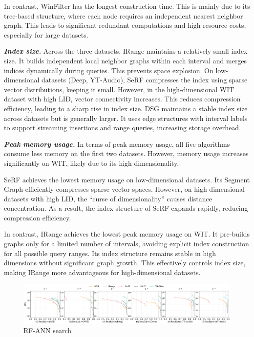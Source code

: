 \documentclass[sigconf, nonacm]{acmart}
\begin{document}
\begin{sloppypar}
In contrast, WinFilter has the longest construction time. This is mainly due to its tree-based structure, where each node requires an independent nearest neighbor graph. This leads to significant redundant computations and high resource costs, especially for large datasets.






\textit{\textbf{Index size.}} Across the three datasets, IRange maintains a relatively small index size. It builds independent local neighbor graphs within each interval and merges indices dynamically during queries. This prevents space explosion. On low-dimensional datasets (Deep, YT-Audio), SeRF compresses the index using sparse vector distributions, keeping it small. However, in the high-dimensional WIT dataset with high LID, vector connectivity increases. This reduces compression efficiency, leading to a sharp rise in index size. DSG maintains a stable index size across datasets but is generally larger. It uses edge structures with interval labels to support streaming insertions and range queries, increasing storage overhead.


\textit{\textbf{Peak memory usage.}}
In terms of peak memory usage, all five algorithms consume less memory on the first two datasets. However, memory usage increases significantly on WIT, likely due to its high dimensionality.

SeRF achieves the lowest memory usage on low-dimensional datasets. Its Segment Graph efficiently compresses sparse vector spaces. However, on high-dimensional datasets with high LID, the “curse of dimensionality” causes distance concentration. As a result, the index structure of SeRF expands rapidly, reducing compression efficiency.

In contrast, IRange achieves the lowest peak memory usage on WIT. It pre-builds graphs only for a limited number of intervals, avoiding explicit index construction for all possible query ranges. Its index structure remains stable in high dimensions without significant graph growth. This effectively controls index size, making IRange more advantageous for high-dimensional datasets.

\begin{figure}[htbp]
  \centering
  \setlength{\abovecaptionskip}{0cm}
    \setlength{\belowcaptionskip}{-0.4cm}
  \includegraphics[width=\textwidth]{figures/exp/exp_8_2.pdf}
  \caption{RF-ANN search }
  \label{fig:exp_8_2}
\end{figure}



\end{sloppypar}
\end{document}
